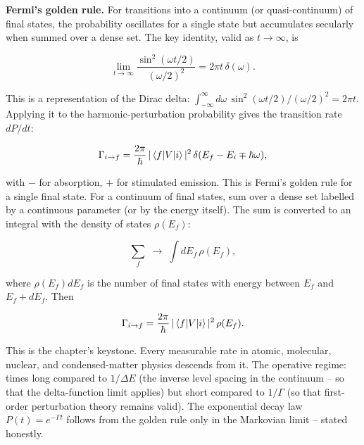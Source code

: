 \medskip\noindent\textbf{Fermi's golden rule.}
For transitions into a continuum (or quasi-continuum) of final states, the probability oscillates for a single state but accumulates secularly when summed over a dense set. The key identity, valid as $t \to \infty$, is
\begin{linenomath}
\begin{equation*}
\lim_{t\to\infty}\frac{\sin^{2}(\omega t/2)}{(\omega/2)^{2}} = 2\pi t\,\delta(\omega).
\end{equation*}
\end{linenomath}
This is a representation of the Dirac delta: $\int_{-\infty}^{\infty} d\omega\,\sin^{2}(\omega t/2)/(\omega/2)^{2} = 2\pi t$. Applying it to the harmonic-perturbation probability gives the transition rate $dP/dt$:
\begin{linenomath}
\begin{equation*}
\Gamma_{i\to f} = \frac{2\pi}{\hbar}\,|\braket{f|V|i}|^{2}\,\delta(E_{f} - E_{i} \mp \hbar\omega),
\end{equation*}
\end{linenomath}
with $-$ for absorption, $+$ for stimulated emission. This is Fermi's golden rule for a single final state. For a continuum of final states, sum over a dense set labelled by a continuous parameter (or by the energy itself). The sum is converted to an integral with the density of states $\rho(E_{f})$:
\begin{linenomath}
\begin{equation*}
\sum_{f} \;\longrightarrow\; \int dE_{f}\,\rho(E_{f}),
\end{equation*}
\end{linenomath}
where $\rho(E_{f})dE_{f}$ is the number of final states with energy between $E_{f}$ and $E_{f}+dE_{f}$. Then
\begin{linenomath}
\begin{equation}
\Gamma_{i\to f} = \frac{2\pi}{\hbar}\,|\braket{f|V|i}|^{2}\,\rho(E_{f}).
\label{eq:fermi-golden-rule}
\end{equation}
\end{linenomath}
This is the chapter's keystone. Every measurable rate in atomic, molecular, nuclear, and condensed-matter physics descends from it. The operative regime: times long compared to $1/\Delta E$ (the inverse level spacing in the continuum -- so that the delta-function limit applies) but short compared to $1/\Gamma$ (so that first-order perturbation theory remains valid). The exponential decay law $P(t) = e^{-\Gamma t}$ follows from the golden rule only in the Markovian limit -- stated honestly.

